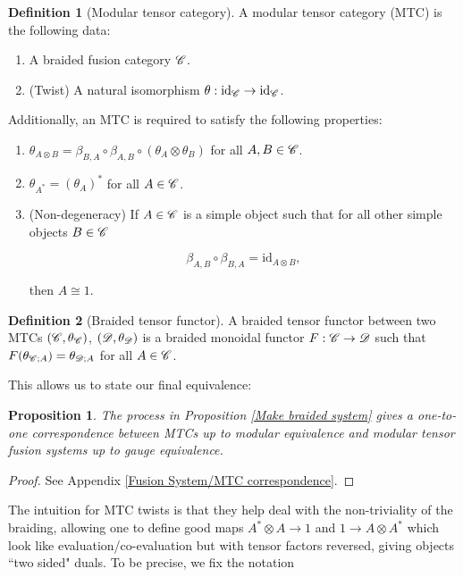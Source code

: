 \documentclass{article}
\newtheorem{proposition}{Proposition}[section]
\theoremstyle{definition}
\newtheorem*{definition}{Definition}
\numberwithin{figure}{section}
\begin{document}
\begin{definition}[Modular tensor category] A modular tensor category (MTC) is the following data:

\begin{enumerate}
\item A braided fusion category $\mathscr{C}$.
\item (Twist) A natural isomorphism $\theta:\mathrm{id}_{\mathscr{C}} \to \mathrm{id}_{\mathscr{C}}$.
\end{enumerate}

Additionally, an MTC is required to satisfy the following properties:

\begin{enumerate}
\item $\theta_{A\otimes B}=\beta_{B,A}\circ \beta_{A,B}\circ (\theta_{A}\otimes \theta_{B})$ for all $A,B\in \mathscr{C}$.
\item $\theta_{A^*}=\left(\theta_A\right)^*$ for all $A\in \mathscr{C}$.
\item (Non-degeneracy) If $A\in \mathscr{C}$ is a simple object such that for all other simple objects $B\in \mathscr{C}$

$$\beta_{A,B}\circ \beta_{B,A}=\mathrm{id}_{A\otimes B},$$

then $A\cong 1$.
\end{enumerate}
\raggedleft\qedsymbol{}
\end{definition}

\begin{definition}[Braided tensor functor] A braided tensor functor between two MTCs $(\mathscr{C},\theta_{\mathscr{C}})$, $(\mathscr{D},\theta_{\mathscr{D}})$ is a braided monoidal functor $F:\mathscr{C}\to \mathscr{D}$ such that $F(\theta_{\mathscr{C};A})=\theta_{\mathscr{D};A}$ for all $A\in \mathscr{C}$.

\raggedleft\qedsymbol{}
\end{definition}

This allows us to state our final equivalence:

\begin{proposition}\label{Make MTC} The process in Proposition \ref{Make braided system} gives a one-to-one correspondence between MTCs up to modular equivalence and modular tensor fusion systems up to gauge equivalence.
\end{proposition}
\begin{proof} See Appendix \ref{Fusion System/MTC correspondence}.
\end{proof}

The intuition for MTC twists is that they help deal with the non-triviality of the braiding, allowing one to define good maps $A^{*}\otimes A\to 1$ and $1\to A\otimes A^{*}$ which look like evaluation/co-evaluation but with tensor factors reversed, giving objects ``two sided" duals. To be precise, we fix the notation
\end{document}
